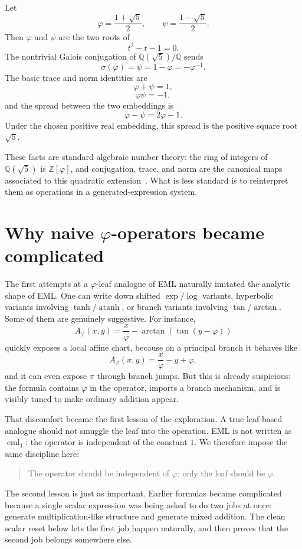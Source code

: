 \documentclass[11pt]{article}
\newcommand{\sig}{\sigma}
\newcommand{\ph}{\varphi}
\newcommand{\ps}{\psi}
\newcommand{\Q}{\mathbb{Q}}
\newcommand{\Z}{\mathbb{Z}}
\begin{document}
Let
\[
    \ph=\frac{1+\sqrt5}{2},\qquad \ps=\frac{1-\sqrt5}{2}.
\]
Then $\ph$ and $\ps$ are the two roots of
\[
    t^2-t-1=0.
\]
The nontrivial Galois conjugation of $\Q(\sqrt5)/\Q$ sends
\[
    \sig(\ph)=\ps=1-\ph=-\ph^{-1}.
\]
The basic trace and norm identities are
\[
    \ph+\ps=1,
\]
\[
    \ph\ps=-1,
\]
and the spread between the two embeddings is
\[
    \ph-\ps=2\ph-1.
\]
Under the chosen positive real embedding, this spread is the positive square root $\sqrt5$.

These facts are standard algebraic number theory: the ring of integers of $\Q(\sqrt5)$ is $\Z[\ph]$, and conjugation, trace, and norm are the canonical maps associated to this quadratic extension~\cite{Marcus1977,ConradTraceNorm}.  What is less standard is to reinterpret them as operations in a generated-expression system.

\section{Why naive \texorpdfstring{$\varphi$}{phi}-operators became complicated}

The first attempts at a $\ph$-leaf analogue of EML naturally imitated the analytic shape of EML\@.  One can write down shifted $\exp/\log$ variants, hyperbolic variants involving $\tanh/\operatorname{atanh}$, or branch variants involving $\tan/\arctan$.  Some of them are genuinely suggestive.  For instance,
\[
    A_\ph(x,y)=\frac{x}{\ph}-\arctan(\tan(y-\ph))
\]
quickly exposes a local affine chart, because on a principal branch it behaves like
\[
    A_\ph(x,y)=\frac{x}{\ph}-y+\ph,
\]
and it can even expose $\pi$ through branch jumps.  But this is already suspicious: the formula contains $\ph$ in the operator, imports a branch mechanism, and is visibly tuned to make ordinary addition appear.

That discomfort became the first lesson of the exploration.  A true leaf-based analogue should not smuggle the leaf into the operation.  EML is not written as $\operatorname{eml}_1$; the operator is independent of the constant $1$.  We therefore impose the same discipline here:
\begin{quote}
The operator should be independent of $\ph$; only the leaf should be $\ph$.
\end{quote}
The second lesson is just as important.  Earlier formulas became complicated because a single scalar expression was being asked to do two jobs at once: generate multiplication-like structure and generate mixed addition.  The clean scalar reset below lets the first job happen naturally, and then proves that the second job belongs somewhere else.
\end{document}
